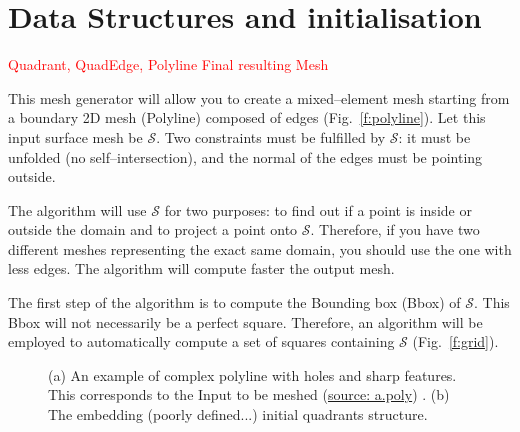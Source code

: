 \documentclass[10pt]{article}
\begin{document}
\section{Data Structures and initialisation}
\label{sec:dataStruct}

\textcolor{red}{Quadrant, QuadEdge, Polyline}
\textcolor{red}{Final resulting Mesh}


This mesh generator will allow you to create a mixed--element mesh starting from a boundary 2D mesh  (Polyline) composed of edges (Fig.~\ref{f:polyline}). Let this input surface mesh be $\mathcal{S}$. Two constraints must be fulfilled by $\mathcal{S}$: it must be unfolded (no self--intersection), and the normal of the edges must be pointing outside.

The algorithm will use $\mathcal{S}$ for two purposes: to find out if a point is inside or outside the domain and to project a point onto $\mathcal{S}$. Therefore, if you have two different meshes representing the exact same domain, you should use the one with less edges. The algorithm will compute faster the output mesh.

The first step of the algorithm is to compute the Bounding box (Bbox) of $\mathcal{S}$. This Bbox will not necessarily be a perfect square. Therefore, an algorithm will be employed to automatically compute a set of squares containing $\mathcal{S}$ (Fig.~\ref{f:grid}).

 \begin{figure}[htb]
\centering
\caption{ (a) An example of complex polyline with holes and sharp features. This corresponds to the Input to be meshed (\href{https://github.com/jaillet/MixedQuadTree/blob/master/data/a.poly}{source: a.poly}) . (b) The embedding (poorly defined...) initial quadrants structure. }
\label{fig:boundary}
\end{figure}
\end{document}

